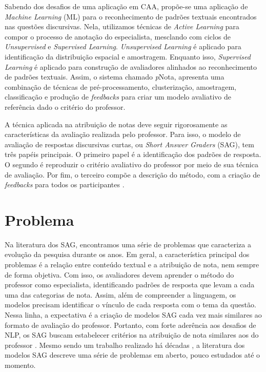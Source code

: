 Sabendo dos desafios de uma aplicação em CAA, propõe-se uma aplicação de \textit{Machine Learning} (ML) para o reconhecimento de padrões textuais encontrados nas questões discursivas. Nela, utilizamos técnicas de \textit{Active Learning} para compor o processo de anotação do especialista, mesclando com ciclos de \textit{Unsupervised} e \textit{Supervised Learning}. \textit{Unsupervised Learning} é aplicado para identificação da distribuição espacial e amostragem. Enquanto isso, \textit{Supervised Learning} é aplicado para construção de avaliadores alinhados ao reconhecimento de padrões textuais. Assim, o sistema chamado \textit{p}Nota, apresenta uma combinação de técnicas de pré-processamento, clusterização, amostragem, classificação e produção de \textit{feedbacks} para criar um modelo avaliativo de referência dado o critério do professor.

A técnica aplicada na atribuição de notas deve seguir rigorosamente as características da avaliação realizada pelo professor. Para isso, o modelo de avaliação de respostas discursivas curtas, ou \textit{Short Answer Graders} (SAG), tem três papéis principais. O primeiro papel é a identificação dos padrões de resposta. O segundo é reproduzir o critério avaliativo do professor por meio de sua técnica de avaliação. Por fim, o terceiro compõe a descrição do método, com a criação de \textit{feedbacks} para todos os participantes \cite{arter2006, spalenza2016a}.


\section{Problema} 
\label{cap1-problema}

Na literatura dos SAG, encontramos uma série de problemas que caracteriza a evolução da pesquisa durante os anos. Em geral, a característica principal dos problemas é a relação entre conteúdo textual e a atribuição de nota, nem sempre de forma objetiva. Com isso, os avaliadores devem aprender o método do professor como especialista, identificando padrões de resposta que levam a cada uma das categorias de nota. Assim, além de compreender a linguagem, os modelos precisam identificar o vínculo de cada resposta com o tema da questão. Nessa linha, a expectativa é a criação de modelos SAG cada vez mais similares ao formato de avaliação do professor. Portanto, com forte aderência aos desafios de NLP, os SAG buscam estabelecer critérios na atribuição de nota similares aos do professor \cite{pado2021}. Mesmo sendo um trabalho realizado há décadas \cite{burrows2015}, a literatura dos modelos SAG descreve uma série de problemas em aberto, pouco estudados até o momento.

